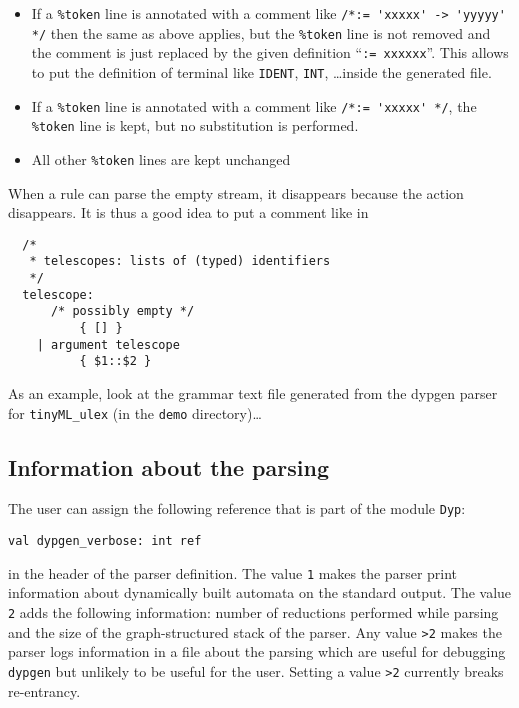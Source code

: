 \documentclass[12pt]{article}
\begin{document}
{\begin{itemize}
\item If a \verb|%token| line is annotated with a comment like
\verb|/*:= 'xxxxx' -> 'yyyyy' */| then the same as above applies, but the \verb|%token| line is
not removed and the comment is just replaced by the given definition
``\verb|:= xxxxxx|''.  This allows to put the definition of terminal like \verb|IDENT|, \verb|INT|, \ldots  inside the generated file.

\item If a \verb|%token| line is annotated with a comment like
\verb|/*:= 'xxxxx' */|, the \verb|%token| line is kept, but no substitution is performed.

\item All other \verb|%token| lines are kept unchanged

\end{itemize}

When a rule can parse the empty stream, it disappears because the action
disappears. It is thus a good idea to put a comment like in

\begin{verbatim}
  /*
   * telescopes: lists of (typed) identifiers
   */
  telescope:
      /* possibly empty */
          { [] }
    | argument telescope
          { $1::$2 }
\end{verbatim}

As an example, look at the grammar text file generated from the dypgen
parser for \verb|tinyML_ulex| (in the \verb|demo| directory)\ldots

\subsection{Information about the parsing}\label{verbose}

The user can assign the following reference that is part of the module \verb|Dyp|:
\begin{verbatim}
val dypgen_verbose: int ref
\end{verbatim}
in the header of the parser definition. The value \texttt{1} makes the parser print information about dynamically built automata on the standard output. The value \texttt{2} adds the following information: number of reductions performed while parsing and the size of the graph-structured stack of the parser. Any value \texttt{>2} makes the parser logs information in a file about the parsing which are useful for debugging \texttt{dypgen} but unlikely to be useful for the user. Setting a value \verb|>2| currently breaks re-entrancy.\\

}
\end{document}
